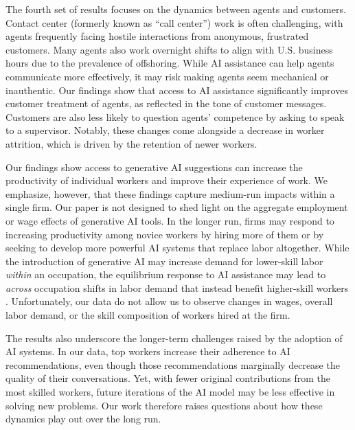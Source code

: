 \documentclass[11pt]{article}
\begin{document}
The fourth set of results focuses on the dynamics between agents and customers. Contact center (formerly known as ``call center'') work is often challenging, with agents frequently facing hostile interactions from anonymous, frustrated customers. Many agents also work overnight shifts to align with U.S. business hours due to the prevalence of offshoring. While AI assistance can help agents communicate more effectively, it may risk making agents seem mechanical or inauthentic. Our findings show that access to AI assistance significantly improves customer treatment of agents, as reflected in the tone of customer messages. Customers are also less likely to question agents' competence by asking to speak to a supervisor. Notably, these changes come alongside a decrease in worker attrition, which is driven by the retention of newer workers.  

Our findings show access to generative AI suggestions can increase the productivity of individual workers and improve their experience of work.  We emphasize, however, that these findings capture medium-run impacts within a single firm. Our paper is not designed to shed light on the aggregate employment or wage effects of generative AI tools. In the longer run, firms may respond to increasing productivity among novice workers by hiring more of them or by seeking to develop more powerful AI systems that replace labor altogether.  While the introduction of generative AI may increase demand for lower-skill labor \textit{within} an occupation, the equilibrium response to AI assistance may lead to \textit{across} occupation shifts in labor demand that instead benefit higher-skill workers \citep{autorSkillContentRecent, acemogluLowSkillHighSkillAutomation2018, acemogluSimpleMacroeconomicsAI}. Unfortunately, our data do not allow us to observe changes in wages, overall labor demand, or the skill composition of workers hired at the firm.

The results also underscore the longer-term challenges raised by the adoption of AI systems.  In our data, top workers increase their adherence to AI recommendations, even though those recommendations marginally decrease the quality of their conversations.  Yet, with fewer original contributions from the most skilled workers, future iterations of the AI model may be less effective in solving new problems. Our work therefore raises questions about how these dynamics play out over the long run. 
\end{document}
